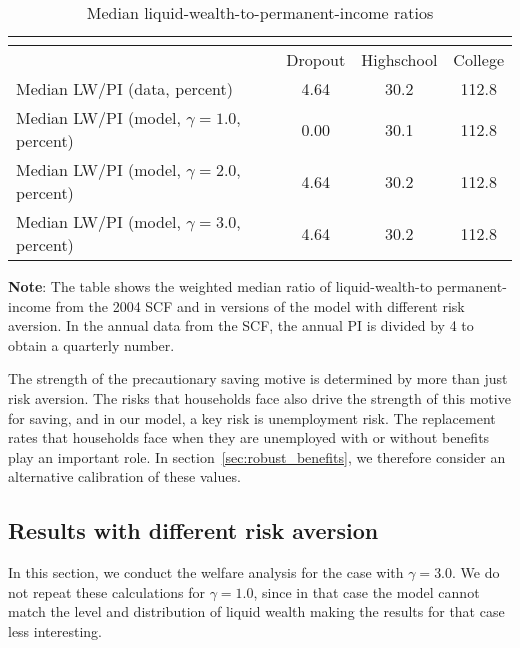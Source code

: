 \documentclass[\latexroot/\projectname]{subfiles}
\begin{document}
\begin{table}[th]
  \begin{center}
    \begin{tabular}{lccc}
      \multicolumn{4}{l}{}                                                           \\ \midrule
                                                    & Dropout & Highschool & College \\ \midrule
      Median LW/PI (data, percent)                  & 4.64    & 30.2       & 112.8   \\
      Median LW/PI (model, $\gamma = 1.0$, percent) & 0.00    & 30.1       & 112.8   \\
      Median LW/PI (model, $\gamma = 2.0$, percent) & 4.64    & 30.2       & 112.8   \\
      Median LW/PI (model, $\gamma = 3.0$, percent) & 4.64    & 30.2       & 112.8   \\ \bottomrule
    \end{tabular}
    \caption{Median liquid-wealth-to-permanent-income ratios}
    \whenintegrated{\label{tab:robustness_gamma_mlwpi}} 
    \parbox{15cm}{\small \vspace{.05cm} \textbf{Note}: The table shows the weighted median ratio of liquid-wealth-to permanent-income from the 2004 SCF and in versions of the model with different risk aversion.
      In the annual data from the SCF, the annual PI is divided by 4 to obtain a quarterly number.\normalsize}
  \end{center}
\end{table}



The strength of the precautionary saving motive is determined by more than just risk aversion.
The risks that households face also drive the strength of this motive for saving, and in our model, a key risk is unemployment risk.
The replacement rates that households face when they are unemployed with or without benefits play an important role.
In section~\ref{sec:robust_benefits}, we therefore consider an alternative calibration of these values.

\subsection*{Results with different risk aversion}
\whenintegrated{\label{sec:robust_gamma_results}} 

In this section, we conduct the welfare analysis for the case with $\gamma=3.0$.
We do not repeat these calculations for $\gamma=1.0$, since in that case the model cannot match the level and distribution of liquid wealth making the results for that case less interesting.
\end{document}
